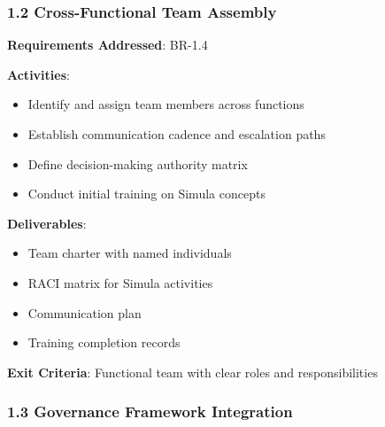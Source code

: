 \subsubsection{1.2 Cross-Functional Team Assembly}

\begin{tcolorbox}[colback=blue!5,colframe=blue!70,title=1.2 Team Organization]
\textbf{Requirements Addressed}: BR-1.4

\textbf{Activities}:
\begin{itemize}
  \item Identify and assign team members across functions
  \item Establish communication cadence and escalation paths
  \item Define decision-making authority matrix
  \item Conduct initial training on Simula concepts
\end{itemize}

\textbf{Deliverables}:
\begin{itemize}
  \item Team charter with named individuals
  \item RACI matrix for Simula activities
  \item Communication plan
  \item Training completion records
\end{itemize}

\textbf{Exit Criteria}: Functional team with clear roles and responsibilities
\end{tcolorbox}

\subsubsection{1.3 Governance Framework Integration}

